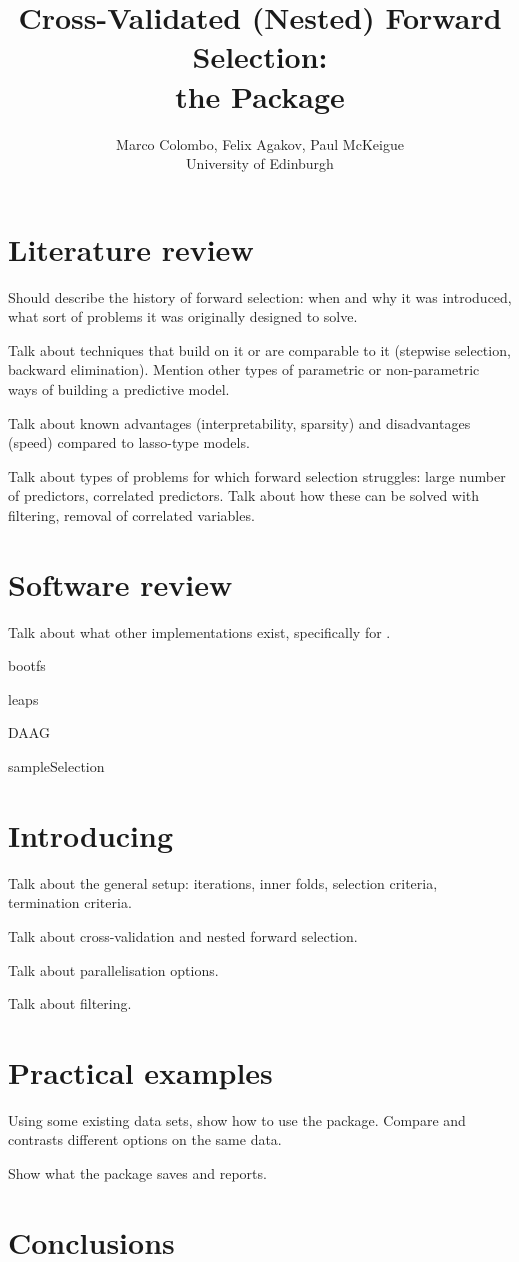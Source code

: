 \documentclass[article]{jss}
\author{Marco Colombo,
        Felix Agakov,
        Paul McKeigue\\
        University of Edinburgh}
\title{Cross-Validated (Nested) Forward Selection:\\
       the \proglang{R} Package \pkg{nestfs}}
\begin{document}


\section{Literature review}

Should describe the history of forward selection: when and why it was
introduced, what sort of problems it was originally designed to solve.

Talk about techniques that build on it or are comparable to it (stepwise
selection, backward elimination). Mention other types of parametric or
non-parametric ways of building a predictive model.

Talk about known advantages (interpretability, sparsity) and disadvantages
(speed) compared to lasso-type models.

Talk about types of problems for which forward selection struggles: large
number of predictors, correlated predictors. Talk about how these can be
solved with filtering, removal of correlated variables.

\section{Software review}

Talk about what other implementations exist, specifically for .

bootfs

leaps

DAAG

sampleSelection

\section[Introducing nestfs]{Introducing }

Talk about the general setup: iterations, inner folds, selection criteria,
termination criteria.

Talk about cross-validation and nested forward selection.

Talk about parallelisation options.

Talk about filtering.

\section{Practical examples}

Using some existing data sets, show how to use the package. Compare and
contrasts different options on the same data. 

Show what the package saves and reports.

\section{Conclusions}
\end{document}
